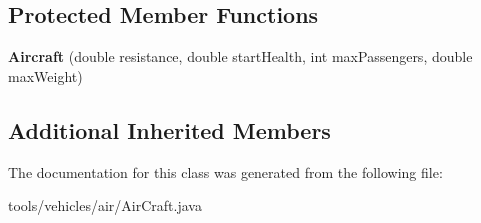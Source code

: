 \subsection*{Protected Member Functions}
\begin{DoxyCompactItemize}
\item 
{\bfseries Aircraft} (double resistance, double start\+Health, int max\+Passengers, double max\+Weight)\hypertarget{classtools_1_1vehicles_1_1air_1_1_aircraft_a464d0e158816d1945d4b35f57eec079c}{}\label{classtools_1_1vehicles_1_1air_1_1_aircraft_a464d0e158816d1945d4b35f57eec079c}

\end{DoxyCompactItemize}
\subsection*{Additional Inherited Members}


The documentation for this class was generated from the following file\+:\begin{DoxyCompactItemize}
\item 
tools/vehicles/air/Air\+Craft.\+java\end{DoxyCompactItemize}
